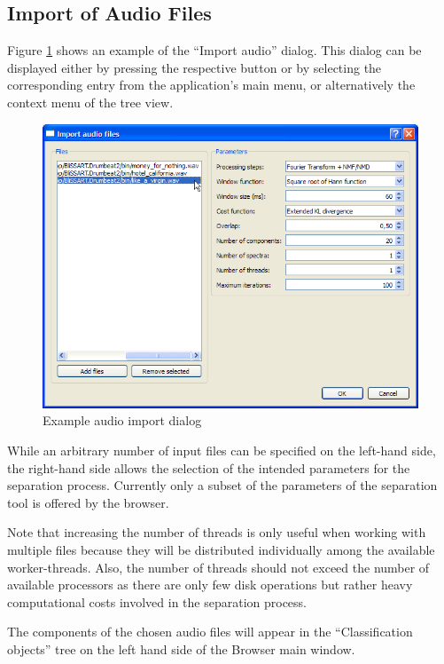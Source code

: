 \subsection{Import of Audio Files}

Figure \ref{figure:ProcessCreation} shows an example of the ``Import audio''
dialog. This dialog can be displayed either by pressing the respective button or
by selecting the corresponding entry from the application's main menu, or
alternatively the context menu of the tree view.

\begin{figure}
    \includegraphics[width=\textwidth]{images/ProcessCreation.png}
    \caption{%
        \label{figure:ProcessCreation}%
        Example audio import dialog
    }
\end{figure}

While an arbitrary number of input files can be specified on the left-hand side,
the right-hand side allows the selection of the intended parameters for the
separation process. Currently only a subset of the parameters of the separation
tool is offered by the browser.

Note that increasing the number of threads is only useful when working with
multiple files because they will be distributed individually among the available
worker-threads. Also, the number of threads should not exceed the number of
available processors as there are only few disk operations but rather heavy
computational costs involved in the separation process.

The components of the chosen audio files will appear in the ``Classification
objects'' tree on the left hand side of the Browser main window.


